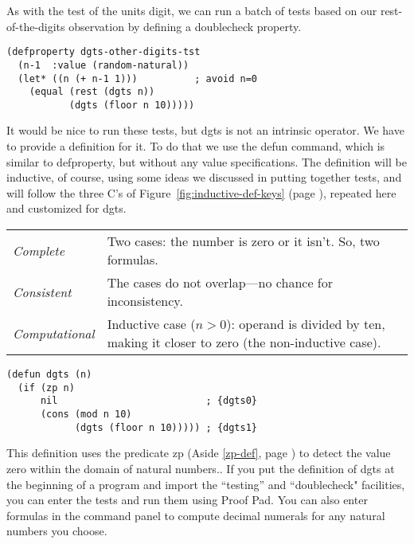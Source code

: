 As with the test of the units digit,
we can run a batch of tests based on our rest-of-the-digits
observation by defining a doublecheck property.
\begin{Verbatim}
(defproperty dgts-other-digits-tst
  (n-1  :value (random-natural))
  (let* ((n (+ n-1 1)))          ; avoid n=0
    (equal (rest (dgts n))
           (dgts (floor n 10)))))
\end{Verbatim}

It would be nice to run these tests, but dgts is not an intrinsic operator.
We have to provide a definition for it.
To do that we use the defun command, which is similar to defproperty,
but without any value specifications. The definition will be inductive,
of course, using some ideas we discussed in putting together tests,
and will follow the three C's of Figure~\ref{fig:inductive-def-keys}
(page \pageref{fig:inductive-def-keys}), repeated here and customized for dgts.
\begin{samepage}
\begin{center}
\begin{tabular}{lp{3.5in}}
\emph{Complete}      & Two cases: the number is zero or it isn't. So, two formulas.\\
\emph{Consistent}    & The cases do not overlap---no chance for inconsistency.\\
\emph{Computational} & Inductive case ($n > 0$): operand is
                       divided by ten, making it closer to zero
                       (the non-inductive case).
\end{tabular}
\end{center}
\end{samepage}

\label{dgts-defun}
\begin{Verbatim}
(defun dgts (n)
  (if (zp n)
      nil                          ; {dgts0}
      (cons (mod n 10)
            (dgts (floor n 10))))) ; {dgts1}
\end{Verbatim}

This definition uses the predicate zp (Aside \ref{zp-def}, page \pageref{zp-def})
to detect the value zero within the domain of natural numbers..
If you put the definition of dgts at the beginning of a program
and import the ``testing'' and ``doublecheck" facilities, you
can enter the tests and run them using Proof Pad.
You can also enter formulas in the command panel to compute
decimal numerals for any natural numbers you choose.

